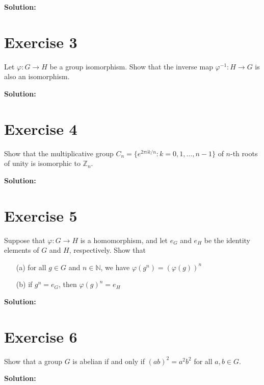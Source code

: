 \documentclass{article}
\begin{document}
\textbf{Solution:}
\newpage

\section*{Exercise 3}
Let $\varphi: G \to H$ be a group isomorphism. Show that the inverse map $\varphi^{-1}: H \to G$ is also an isomorphism.

\textbf{Solution:}
\newpage

\section*{Exercise 4}
Show that the multiplicative group $C_n = \{e^{2\pi i k/n} : k = 0,1,\ldots,n-1\}$ of $n$-th roots of unity is isomorphic to $\mathbb{Z}_n$.

\textbf{Solution:}
\newpage

\section*{Exercise 5}
Suppose that $\varphi: G \to H$ is a homomorphism, and let $e_G$ and $e_H$ be the identity elements of $G$ and $H$, respectively. Show that
\begin{itemize}
\item[(a)] for all $g \in G$ and $n \in \mathbb{N}$, we have $\varphi(g^n) = (\varphi(g))^n$
\item[(b)] if $g^n = e_G$, then $\varphi(g)^n = e_H$
\end{itemize}

\textbf{Solution:}
\newpage

\section*{Exercise 6}
Show that a group $G$ is abelian if and only if $(ab)^2 = a^2b^2$ for all $a,b \in G$.

\textbf{Solution:}
\end{document}
